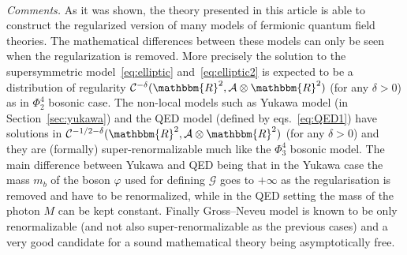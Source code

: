 \documentclass[11pt]{article}
\newcommand{\tmtextit}[1]{{\itshape{#1}}}
\begin{document}
\

\tmtextit{Comments.} As it was shown, the theory presented in this article is
able to construct the regularized version of many models of fermionic quantum
field theories. The mathematical differences between these models can only be
seen when the regularization is removed. More precisely the solution to the
supersymmetric model~{\eqref{eq:elliptic}} and~{\eqref{eq:elliptic2}} is
expected to be a distribution of regularity $\mathcal{C}^{- \delta}
(\mathbbm{R}^2, \mathcal{A} \otimes \mathbbm{R}^2)$ (for any $\delta > 0$) as in
$\Phi^4_2$ bosonic case. The non-local models such as Yukawa model (in
Section~\ref{sec:yukawa}) and the QED model (defined by
eqs.~{\eqref{eq:QED1}}) have solutions in $\mathcal{C}^{- 1 / 2 - \delta}
(\mathbbm{R}^2, \mathcal{A} \otimes \mathbbm{R}^2)$ (for any $\delta > 0$) and
they are (formally) super-renormalizable much like the $\Phi^4_3$ bosonic
model. The main difference between Yukawa and QED being that in the Yukawa
case the mass $m_b$ of the boson $\varphi$ used for defining $\mathcal{G}$
goes to $+ \infty$ as the regularisation is removed and have to be
renormalized, while in the QED setting the mass of the photon $M$ can be kept
constant. Finally Gross--Neveu model is known to be only renormalizable (and
not also super-renormalizable as the previous cases) and a very good candidate
for a sound mathematical theory being asymptotically free.
\end{document}
